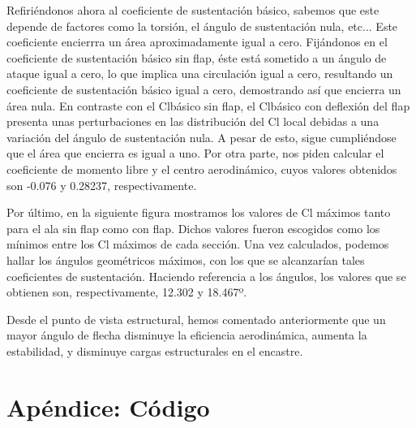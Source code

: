 \documentclass[9pt, a4paper]{article}
\begin{document}
Refiriéndonos ahora al coeficiente de sustentación básico, sabemos que este depende de factores como la torsión, el ángulo de sustentación nula, etc... Este coeficiente encierrra un área aproximadamente igual a cero. Fijándonos en el coeficiente de sustentación básico sin flap, éste está sometido a un ángulo de ataque igual a cero, lo que implica una circulación igual a cero, resultando un coeficiente de sustentación básico igual a cero, demostrando así que encierra un área nula.
En contraste con el Clbásico sin flap, el Clbásico con deflexión del flap presenta unas perturbaciones en las distribución del Cl local debidas a una variación del ángulo de sustentación nula. A pesar de esto, sigue cumpliéndose que el área que encierra es igual a uno.
Por otra parte, nos piden calcular el coeficiente de momento libre y el centro aerodinámico, cuyos valores obtenidos son -0.076 y 0.28237, respectivamente.

Por último, en la siguiente figura mostramos los valores de Cl máximos tanto para el ala sin flap como con flap. Dichos valores fueron escogidos como los mínimos entre los Cl máximos de cada sección. Una vez calculados, podemos hallar los ángulos geométricos máximos, con los que se alcanzarían tales coeficientes de sustentación.
Haciendo referencia a los ángulos, los valores que se obtienen son, respectivamente, 12.302 y 18.467º.

Desde el punto de vista estructural, hemos comentado anteriormente que un mayor ángulo de flecha disminuye la eficiencia aerodinámica, aumenta la estabilidad, y disminuye cargas estructurales en el encastre.

\section{Apéndice: Código}














\end{document}
